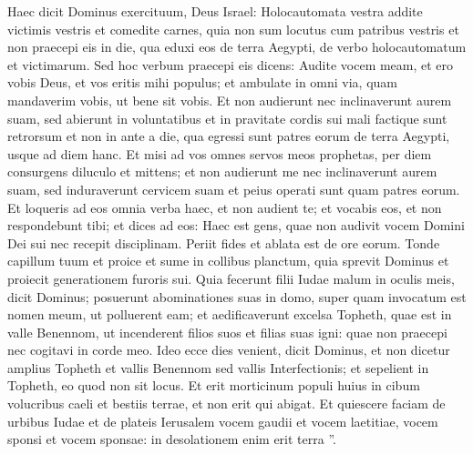 \begin{biblechapter}
\begin{biblechapter}
\begin{biblechapter}
\begin{biblechapter}
\begin{biblechapter}
\begin{biblechapter}
\begin{biblechapter}
 \verse Haec dicit Dominus exercituum, Deus Israel: Holocautomata vestra addite victimis vestris et comedite carnes, 
\verse quia non sum locutus cum patribus vestris et non praecepi eis in die, qua eduxi eos de terra Aegypti, de verbo holocautomatum et victimarum. 
\verse Sed hoc verbum praecepi eis dicens: Audite vocem meam, et ero vobis Deus, et vos eritis mihi populus; et ambulate in omni via, quam mandaverim vobis, ut bene sit vobis. 
\verse Et non audierunt nec inclinaverunt aurem suam, sed abierunt in voluntatibus et in pravitate cordis sui mali factique sunt retrorsum et non in ante 
\verse a die, qua egressi sunt patres eorum de terra Aegypti, usque ad diem hanc. Et misi ad vos omnes servos meos prophetas, per diem consurgens diluculo et mittens; 
\verse et non audierunt me nec inclinaverunt aurem suam, sed induraverunt cervicem suam et peius operati sunt quam patres eorum. 
\verse Et loqueris ad eos omnia verba haec, et non audient te; et vocabis eos, et non respondebunt tibi; 
\verse et dices ad eos: Haec est gens, quae non audivit vocem Domini Dei sui nec recepit disciplinam. Periit fides et ablata est de ore eorum.
 \verse Tonde capillum tuum et proice
 et sume in collibus planctum,
 quia sprevit Dominus
 et proiecit generationem furoris sui.
 \verse Quia fecerunt filii Iudae malum in oculis meis, dicit Dominus; posuerunt abominationes suas in domo, super quam invocatum est nomen meum, ut polluerent eam; 
\verse et aedificaverunt excelsa Topheth, quae est in valle Benennom, ut incenderent filios suos et filias suas igni: quae non praecepi nec cogitavi in corde meo. 
\verse Ideo ecce dies venient, dicit Dominus, et non dicetur amplius Topheth et vallis Benennom sed vallis Interfectionis; et sepelient in Topheth, eo quod non sit locus. 
\verse Et erit morticinum populi huius in cibum volucribus caeli et bestiis terrae, et non erit qui abigat. 
\verse Et quiescere faciam de urbibus Iudae et de plateis Ierusalem vocem gaudii et vocem laetitiae, vocem sponsi et vocem sponsae: in desolationem enim erit terra ”.
 

\end{biblechapter}
\end{biblechapter}
\end{biblechapter}
\end{biblechapter}
\end{biblechapter}
\end{biblechapter}
\end{biblechapter}
